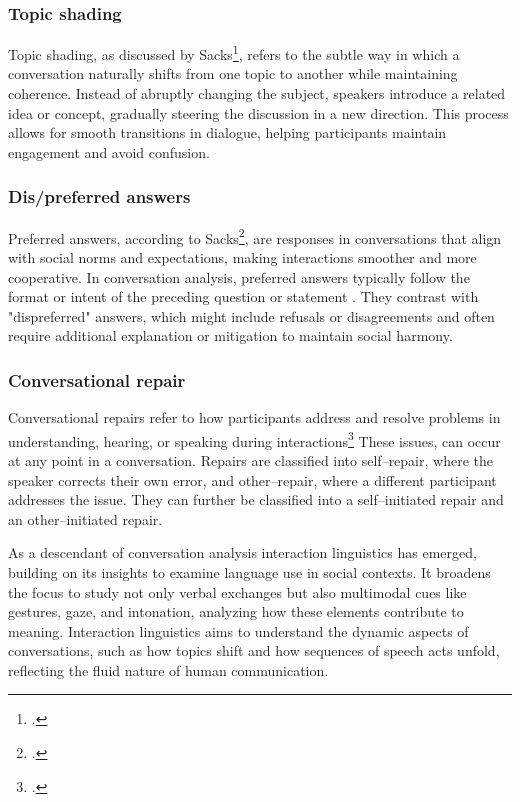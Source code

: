 \documentclass[12pt]{report}
\begin{document}
{    \subsubsection{Topic shading}
    \par
    Topic shading, as discussed by Sacks\footcite{topicshading}, refers to the subtle way in which a conversation naturally shifts from one topic to another while maintaining coherence. Instead of abruptly changing the subject, speakers introduce a related idea or concept, gradually steering the discussion in a new direction. This process allows for smooth transitions in dialogue, helping participants maintain engagement and avoid confusion.

    \subsubsection{Dis/preferred answers}
    \par
    Preferred answers, according to Sacks\footcite[p.~410]{Sacks1992}, are responses in conversations that align with social norms and expectations, making interactions smoother and more cooperative. In conversation analysis, preferred answers typically follow the format or intent of the preceding question or statement . They contrast with "dispreferred" answers, which might include refusals or disagreements and often require additional explanation or mitigation to maintain social harmony.

    \subsubsection{Conversational repair}
    \par
    Conversational repairs refer to how participants address and resolve problems in understanding, hearing, or speaking during interactions\footcite{sacksRepair}
    These issues, can occur at any point in a conversation. Repairs are classified into self–repair, where the speaker corrects their own error, and other–repair, where a different participant addresses the issue. They can further be classified into a self–initiated repair and an other–initiated repair.

\par
As a descendant of conversation analysis interaction linguistics has emerged,
building on its insights to examine language use in social contexts.
It broadens the focus to study not only verbal exchanges but also
multimodal cues like gestures, gaze, and intonation,
analyzing how these elements contribute to meaning.
Interaction linguistics aims to understand the dynamic aspects of conversations,
such as how topics shift and how sequences of speech acts unfold,
reflecting the fluid nature of human communication.

}
\end{document}
